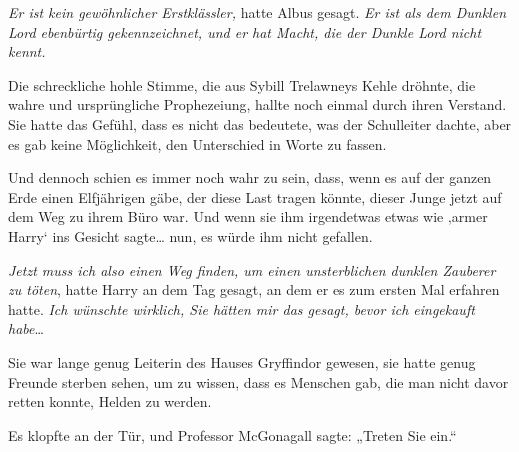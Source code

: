 \emph{Er ist kein gewöhnlicher Erstklässler,} hatte Albus gesagt. \emph{Er ist als dem Dunklen Lord ebenbürtig gekennzeichnet, und er hat Macht, die der Dunkle Lord nicht kennt.}

Die schreckliche hohle Stimme, die aus Sybill Trelawneys Kehle dröhnte, die wahre und ursprüngliche Prophezeiung, hallte noch einmal durch ihren Verstand. Sie hatte das Gefühl, dass es nicht das bedeutete, was der Schulleiter dachte, aber es gab keine Möglichkeit, den Unterschied in Worte zu fassen.

Und dennoch schien es immer noch wahr zu sein, dass, wenn es auf der ganzen Erde einen Elfjährigen gäbe, der diese Last tragen könnte, dieser Junge jetzt auf dem Weg zu ihrem Büro war. Und wenn sie ihm irgendetwas etwas wie ‚armer Harry` ins Gesicht sagte… nun, es würde ihm nicht gefallen.

\emph{Jetzt muss ich also einen Weg finden, um einen unsterblichen dunklen Zauberer zu töten}, hatte Harry an dem Tag gesagt, an dem er es zum ersten Mal erfahren hatte. \emph{Ich wünschte wirklich, Sie hätten mir das gesagt, bevor ich eingekauft habe}…

Sie war lange genug Leiterin des Hauses Gryffindor gewesen, sie hatte genug Freunde sterben sehen, um zu wissen, dass es Menschen gab, die man nicht davor retten konnte, Helden zu werden.

Es klopfte an der Tür, und Professor McGonagall sagte: „Treten Sie ein.“

